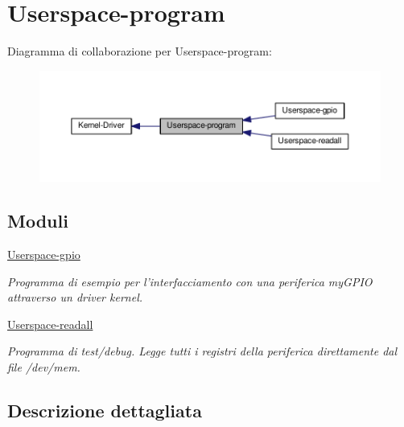 \hypertarget{group___userspace-program}{\section{Userspace-\/program}
\label{group___userspace-program}
}
Diagramma di collaborazione per Userspace-\/program\+:\nopagebreak
\begin{figure}[H]
\begin{center}
\leavevmode
\includegraphics[width=350pt]{group___userspace-program}
\end{center}
\end{figure}
\subsection*{Moduli}
\begin{DoxyCompactItemize}
\item 
\hyperlink{group__userspace-gpio}{Userspace-\/gpio}
\begin{DoxyCompactList}\small\item\em Programma di esempio per l'interfacciamento con una periferica my\+G\+P\+I\+O attraverso un driver kernel. \end{DoxyCompactList}\item 
\hyperlink{group__userspace-readall}{Userspace-\/readall}
\begin{DoxyCompactList}\small\item\em Programma di test/debug. Legge tutti i registri della periferica direttamente dal file /dev/mem. \end{DoxyCompactList}\end{DoxyCompactItemize}


\subsection{Descrizione dettagliata}

